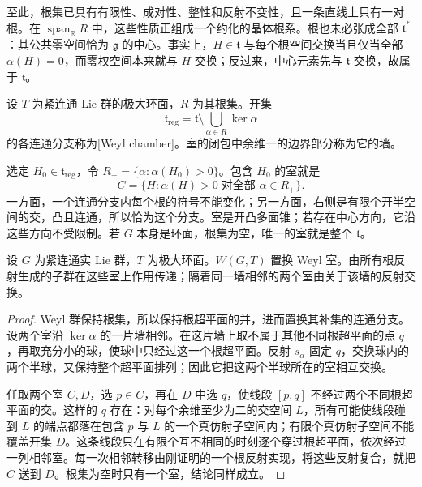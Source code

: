 至此，根集已具有有限性、成对性、整性和反射不变性，且一条直线上只有一对根。在 \(\operatorname{span}_{\mathbb R}R\) 中，这些性质正组成一个约化的晶体根系。根也未必张成全部 \(\mathfrak t^*\)：其公共零空间恰为 \(\mathfrak g\) 的中心。事实上，\(H\in\mathfrak t\) 与每个根空间交换当且仅当全部 \(\alpha(H)=0\)，而零权空间本来就与 \(H\) 交换；反过来，中心元素先与 \(\mathfrak t\) 交换，故属于 \(\mathfrak t\)。

\begin{definition}\label{g1:def:weyl-chamber}
	设 \(T\) 为紧连通 Lie 群的极大环面，\(R\) 为其根集。开集
	\[
		\mathfrak t_{\mathrm{reg}}
		=\mathfrak t\setminus\bigcup_{\alpha\in R}\ker\alpha
	\]
	的各连通分支称为[Weyl chamber]。室的闭包中余维一的边界部分称为它的墙。
\end{definition}

选定 \(H_0\in\mathfrak t_{\mathrm{reg}}\)，令 \(R_+=\{\alpha:\alpha(H_0)>0\}\)。包含 \(H_0\) 的室就是
\[
	C=\{H:\alpha(H)>0\;\text{对全部 }\alpha\in R_+\}.
\]
一方面，一个连通分支内每个根的符号不能变化；另一方面，右侧是有限个开半空间的交，凸且连通，所以恰为这个分支。室是开凸多面锥；若存在中心方向，它沿这些方向不受限制。若 \(G\) 本身是环面，根集为空，唯一的室就是整个 \(\mathfrak t\)。

\begin{proposition}\label{g1:prop:chamber-reflection-transitivity}
	设 \(G\) 为紧连通实 Lie 群，\(T\) 为极大环面。\(W(G,T)\) 置换 Weyl 室。由所有根反射生成的子群在这些室上作用传递；隔着同一墙相邻的两个室由关于该墙的反射交换。
\end{proposition}
\begin{proof}
	Weyl 群保持根集，所以保持根超平面的并，进而置换其补集的连通分支。设两个室沿 \(\ker\alpha\) 的一片墙相邻。在这片墙上取不属于其他不同根超平面的点 \(q\)，再取充分小的球，使球中只经过这一个根超平面。反射 \(s_\alpha\) 固定 \(q\)，交换球内的两个半球，又保持整个超平面排列；因此它把这两个半球所在的室相互交换。

	任取两个室 \(C,D\)，选 \(p\in C\)，再在 \(D\) 中选 \(q\)，使线段 \([p,q]\) 不经过两个不同根超平面的交。这样的 \(q\) 存在：对每个余维至少为二的交空间 \(L\)，所有可能使线段碰到 \(L\) 的端点都落在包含 \(p\) 与 \(L\) 的一个真仿射子空间内；有限个真仿射子空间不能覆盖开集 \(D\)。这条线段只在有限个互不相同的时刻逐个穿过根超平面，依次经过一列相邻室。每一次相邻转移由刚证明的一个根反射实现，将这些反射复合，就把 \(C\) 送到 \(D\)。根集为空时只有一个室，结论同样成立。
\end{proof}



